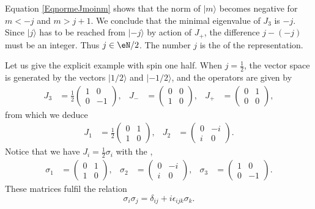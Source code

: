 Equation \eqref{EqnormeJmoinm} shows that the norm of $| m \rangle$ becomes negative for $m<-j$ and $m>j+1$. We conclude that the minimal eigenvalue of $J_3$ is $-j$. Since $| j \rangle$ has to be reached from $| -j \rangle$ by action of $J_+$, the difference $j-(-j)$ must be an integer. Thus $j\in\eN/2$. The number $j$ is the  of the representation.

Let us give the explicit example with spin one half.
When $j=\frac{ 1 }{2}$, the vector space is generated by the vectors $| 1/2 \rangle$ and $| -1/2 \rangle$, and the operators are given by
\begin{align}
    J_3&=\frac{ 1 }{2}
\begin{pmatrix}
  1 &   0   \\
  0 &   -1
\end{pmatrix},
&J_-&=
\begin{pmatrix}
  0 &   0   \\
  1 &   0
\end{pmatrix},
&J_+&=
\begin{pmatrix}
  0 &   1   \\
  0 &   0
\end{pmatrix},
\end{align}
from which we deduce
\begin{align*}
J_1&=\frac{ 1 }{2}
\begin{pmatrix}
  0 &   1   \\
  1 &   0
\end{pmatrix},
&J_2&=
\begin{pmatrix}
  0 &   -i  \\
  i &   0
\end{pmatrix}.
\end{align*}
Notice that we have $J_i=\frac{ 1 }{2}\sigma_i$ with the ,
\begin{align}
\sigma_1&=
\begin{pmatrix}
  0 &   1   \\
  1 &   0
\end{pmatrix},
&\sigma_2&=
\begin{pmatrix}
  0 &   -i  \\
  i &   0
\end{pmatrix},
&\sigma_3&=
\begin{pmatrix}
  1 &   0   \\
  0 &   -1
\end{pmatrix}.
\end{align}
These matrices fulfil the relation
\begin{equation}
    \sigma_i\sigma_j=\delta_{ij}+i\epsilon_{ijk}\sigma_k.
\end{equation}


